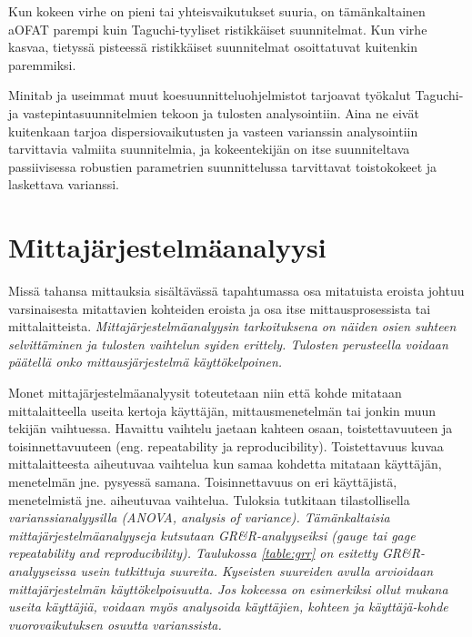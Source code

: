 \documentclass[12pt,a4paper,finnish]{tutthesis}
\begin{document}
Kun kokeen virhe on pieni
tai yhteisvaikutukset suuria, on
tämänkaltainen aOFAT parempi kuin Taguchi-tyyliset ristikkäiset suunnitelmat.
Kun virhe kasvaa, tietyssä pisteessä ristikkäiset suunnitelmat osoittatuvat
kuitenkin paremmiksi.


Minitab ja useimmat muut koesuunnitteluohjelmistot tarjoavat työkalut
Taguchi- ja vastepintasuunnitelmien tekoon ja tulosten analysointiin.
Aina ne eivät kuitenkaan tarjoa dispersiovaikutusten ja vasteen varianssin
analysointiin tarvittavia valmiita suunnitelmia, ja kokeentekijän
on itse suunniteltava passiivisessa robustien parametrien suunnittelussa
tarvittavat toistokokeet ja laskettava varianssi.



\chapter{Mittajärjestelmäanalyysi}
\label{ch:grr}


Missä tahansa mittauksia sisältävässä tapahtumassa osa mitatuista
eroista johtuu varsinaisesta mitattavien kohteiden eroista ja osa itse mittausprosessista
tai mittalaitteista. \em Mittajärjestelmäanalyysin \em tarkoituksena
on näiden osien suhteen selvittäminen ja tulosten vaihtelun syiden erittely.
Tulosten perusteella voidaan päätellä onko mittausjärjestelmä käyttökelpoinen.



Monet mittajärjestelmäanalyysit toteutetaan niin että kohde mitataan
mittalaitteella useita kertoja käyttäjän, mittausmenetelmän tai jonkin muun
tekijän vaihtuessa. Havaittu vaihtelu jaetaan kahteen osaan, toistettavuuteen
ja toisinnettavuuteen (eng. repeatability ja reproducibility). Toistettavuus
kuvaa mittalaitteesta aiheutuvaa vaihtelua kun samaa
kohdetta mitataan käyttäjän, menetelmän jne. pysyessä samana. Toisinnettavuus
on eri käyttäjistä, menetelmistä jne. aiheutuvaa vaihtelua.
Tuloksia tutkitaan tilastollisella \em varianssianalyysilla \em (ANOVA, analysis of variance).
Tämänkaltaisia mittajärjestelmäanalyyseja kutsutaan GR\&R-analyyseiksi
(gauge tai gage repeatability and reproducibility).
Taulukossa \ref{table:grr} on esitetty GR\&R-analyyseissa usein tutkittuja
suureita. Kyseisten suureiden avulla arvioidaan mittajärjestelmän käyttökelpoisuutta.
Jos kokeessa on esimerkiksi ollut mukana useita käyttäjiä, voidaan myös
analysoida käyttäjien, kohteen ja käyttäjä-kohde vuorovaikutuksen osuutta
varianssista.
\end{document}
